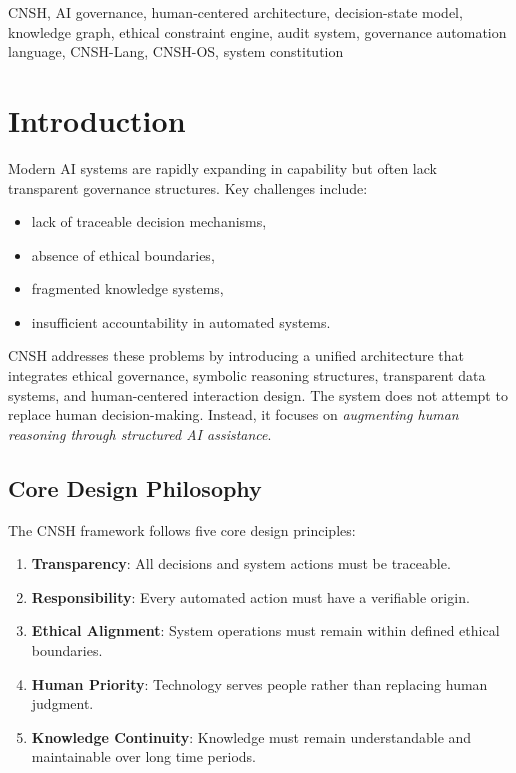\documentclass[conference]{IEEEtran}
\begin{document}
\begin{IEEEkeywords}
CNSH, AI governance, human-centered architecture, decision-state model,
knowledge graph, ethical constraint engine, audit system,
governance automation language, CNSH-Lang, CNSH-OS, system constitution
\end{IEEEkeywords}

\section{Introduction}

Modern AI systems are rapidly expanding in capability but often lack
transparent governance structures. Key challenges include:
\begin{itemize}[nosep]
  \item lack of traceable decision mechanisms,
  \item absence of ethical boundaries,
  \item fragmented knowledge systems,
  \item insufficient accountability in automated systems.
\end{itemize}

CNSH addresses these problems by introducing a unified architecture
that integrates ethical governance, symbolic reasoning structures,
transparent data systems, and human-centered interaction design.
The system does not attempt to replace human decision-making.
Instead, it focuses on \emph{augmenting human reasoning through
structured AI assistance}.

\subsection{Core Design Philosophy}

The CNSH framework follows five core design principles:

\begin{enumerate}[nosep]
  \item \textbf{Transparency}: All decisions and system actions
    must be traceable.
  \item \textbf{Responsibility}: Every automated action must have
    a verifiable origin.
  \item \textbf{Ethical Alignment}: System operations must remain
    within defined ethical boundaries.
  \item \textbf{Human Priority}: Technology serves people rather
    than replacing human judgment.
  \item \textbf{Knowledge Continuity}: Knowledge must remain
    understandable and maintainable over long time periods.
\end{enumerate}
\end{document}
